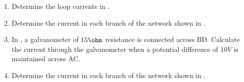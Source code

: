 \begin{enumerate}[label=\thesubsection.\arabic*.,ref=\thesubsection.\theenumi]
	\item Determine the loop currents in 
    . 
		\begin{figure}[H] 
    \centering
    \resizebox{0.75\columnwidth}{!}{
    }
    \caption{} 
    \label{fig:ckt1} 
\end{figure}
	\item Determine the current in each branch of the network shown in 
    . 
		\begin{figure}[H] 
    \centering
    \resizebox{0.75\columnwidth}{!}{
    }
    \caption{} 
    \label{fig:ckt2} 
\end{figure}
	\item In , a galvanometer of $15\ohm$ resistance is connected across BD. Calculate the current through the galvanometer when a potential difference of $10 V$ is maintained across AC.
		\begin{figure}[H] 
    \centering
    \resizebox{0.75\columnwidth}{!}{
    }
    \caption{} 
    \label{fig:ckt3} 
\end{figure}
	\item Determine the current in each branch of the network shown in 
.
		\begin{figure}[H] 
    \centering

\end{figure}
\end{enumerate}
